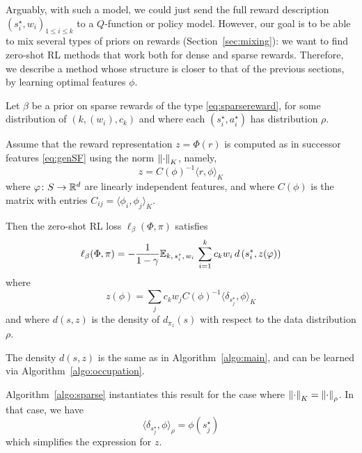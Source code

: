 \documentclass[11pt,a4paper]{article}
\begin{document}
Arguably, with such a model, we could just send the full reward
description $(s^\star_i,w_i)_{1\leq i \leq k}$ to a $Q$-function
or policy model. However, our goal is
to be able to mix several types of priors on rewards
(Section~\ref{sec:mixing}): we want to find zero-shot RL methods that
work both for dense and sparse rewards. Therefore, we describe a method
whose structure is closer to that of the previous sections, by learning
optimal features $\phi$.


\begin{prop}
\label{prop:sparseloss}
Let $\beta$ be a prior on sparse rewards of the type
\eqref{eq:sparsereward}, for some distribution of $(k,(w_i),c_k)$ and
where each $(s^\star_i,a^\star_i)$ has distribution $\rho$.

Assume that the reward representation $z=\Phi(r)$ is computed as in successor
features \eqref{eq:genSF} using the norm $\left\lVert\cdot\right\rVert_K$, namely,
\begin{equation}
z=C(\phi)^{-1} \langle r,\phi\rangle_K
\end{equation}
where $\varphi\colon S\to {\mathbb{R}}^d$ are linearly independent features, and where
$C(\phi)$ is the matrix with entries $C_{ij}= \langle \phi_i,\phi_j\rangle_K$.

Then the zero-shot RL loss $\ell_\beta(\Phi,\pi)$ satisfies
\begin{equation}
\ell_\beta(\Phi,\pi)=-\frac{1}{1-\gamma} \mathbb{E}_{k,\, s^\star_i,\,w_i}\,
\sum_{i=1}^k
c_k w_i\,
d\left(s^\ast_i,z(\varphi)\right)
\end{equation}
where
\begin{equation}
z(\phi)=\sum_j c_kw_j C(\phi)^{-1} \langle \delta_{s^\star_j},\phi\rangle_K
\end{equation}
and where $d(s,z)$ is the density of $d_{\pi_z}(s)$ with respect to the data
distribution $\rho$.%
\end{prop}

The density $d(s,z)$ is the same as in Algorithm~\ref{algo:main}, and can
be learned via Algorithm~\ref{algo:occupation}.

Algorithm~\ref{algo:sparse} instantiates this result for the case where
$\left\lVert\cdot\right\rVert_K=\left\lVert\cdot\right\rVert_\rho$. In that case, we have
\begin{equation}
\langle \delta_{s^\star_j},\phi\rangle_\rho=\phi(s^\star_j)
\end{equation}
which simplifies the expression for $z$.
\end{document}
